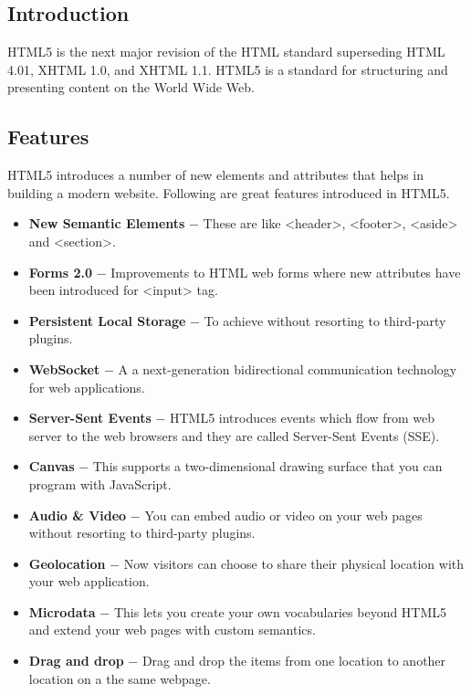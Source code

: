 \documentclass[12pt]{article}
\begin{document}
\subsection{Introduction}
HTML5 is the next major revision of the HTML standard superseding HTML 4.01, XHTML 1.0, and XHTML 1.1. HTML5 is a standard for structuring and presenting content on the World Wide Web.
\subsection{Features}
HTML5 introduces a number of new elements and attributes that helps in building a modern website. Following are great features introduced in HTML5.
\begin{itemize}
	\item \textbf{New Semantic Elements} − These are like <header>, <footer>, <aside> and <section>.
	\item \textbf{Forms 2.0} − Improvements to HTML web forms where new attributes have been introduced for <input> tag.
	\item \textbf{Persistent Local Storage} − To achieve without resorting to third-party plugins.
	\item \textbf{WebSocket} − A a next-generation bidirectional communication technology for web applications.
	\item \textbf{Server-Sent Events} − HTML5 introduces events which flow from web server to the web browsers and they are called Server-Sent Events (SSE).
	\item \textbf{Canvas} − This supports a two-dimensional drawing surface that you can program with JavaScript.
	\item \textbf{Audio \& Video} − You can embed audio or video on your web pages without resorting to third-party plugins.
	\item \textbf{Geolocation} − Now visitors can choose to share their physical location with your web application.
	\item \textbf{Microdata} − This lets you create your own vocabularies beyond HTML5 and extend your web pages with custom semantics.
	\item \textbf{Drag and drop} − Drag and drop the items from one location to another location on a the same webpage.
\end{itemize}	
\end{document}
